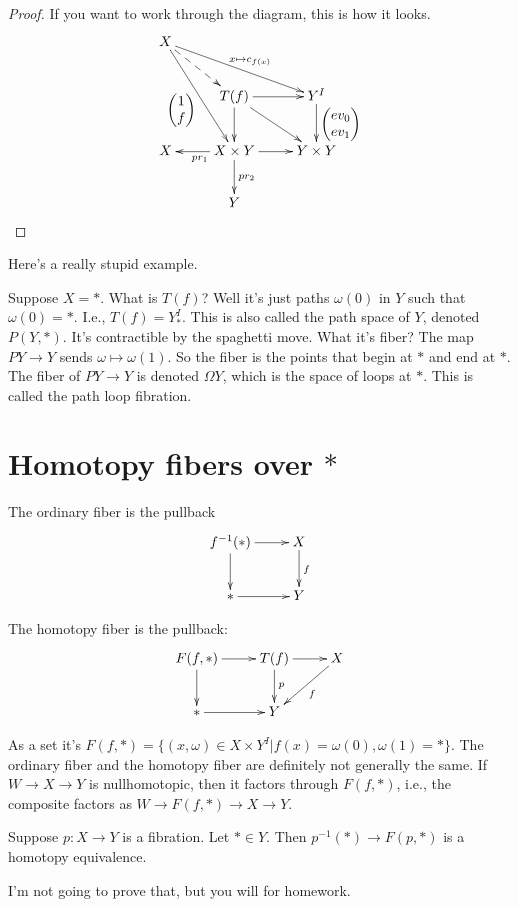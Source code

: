 \begin{proof}
	    If you want to work through the diagram, this is how it looks.
	    \begin{equation*}
		\xymatrix{
		    X\ar@{-->}[dr]\ar[drr]^{x\mapsto c_{f(x)}}\ar[ddr]_{\begin{pmatrix}1 \\ f\end{pmatrix}} & & \\
			& T(f)\ar[d]\ar[r]\ar[dr] & Y^I\ar[d]^{\begin{pmatrix}ev_0 \\ ev_1\end{pmatrix}}\\
			    X & X\times Y\ar[l]^{pr_1}\ar[d]^{pr_2}\ar[r] & Y\times Y\\
		    & Y
		    }
	    \end{equation*}
\end{proof}
Here's a really stupid example. 
\begin{example}
Suppose $X=\ast$. What is $T(f)$? Well it's just paths $\omega(0)$ in $Y$ such that $\omega(0)=\ast$. I.e., $T(f) = Y^I_\ast$. This is also called the path space of $Y$, denoted $P(Y,\ast)$. It's contractible by the spaghetti move. What it's fiber? The map $PY\to Y$ sends $\omega\mapsto \omega(1)$. So the fiber is the points that begin at $\ast$ and end at $\ast$. The fiber of $PY\to Y$ is denoted $\Omega Y$, which is the space of loops at $\ast$. This is called the path loop fibration. 
\end{example}
\section{Homotopy fibers over $\ast$}
The ordinary fiber is the pullback
\begin{equation*}
    \xymatrix{
	f^{-1}(\ast)\ar[r]\ar[d] & X\ar[d]^f\\
	\ast\ar[r] & Y
    }
\end{equation*}
\begin{definition}
    The homotopy fiber is the pullback:
    \begin{equation*}
	\xymatrix{
	    F(f,\ast)\ar[r]\ar[d] & T(f)\ar[r]\ar[d]^p & X\ar[dl]^f\\
	    \ast \ar[r] & Y &
	    }
    \end{equation*}
\end{definition}
As a set it's $F(f,\ast) = \{(x,\omega)\in X\times Y^I| f(x) = \omega(0), \omega(1) = \ast\}$. The ordinary fiber and the homotopy fiber are definitely not generally the same. If $W\to X\to Y$ is nullhomotopic, then it factors through $F(f,\ast)$, i.e., the composite factors as $W\to F(f,\ast)\to X\to Y$.
\begin{prop}
    Suppose $p:X\to Y$ is a fibration. Let $\ast\in Y$. Then $p^{-1}(\ast)\to F(p,\ast)$ is a homotopy equivalence.
\end{prop}
I'm not going to prove that, but you will for homework.

